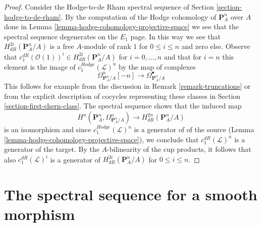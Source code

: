 \begin{proof}
Consider the Hodge-to-de Rham spectral sequence of
Section \ref{section-hodge-to-de-rham}.
By the computation of the Hodge cohomology of $\mathbf{P}^n_A$ over $A$
done in Lemma \ref{lemma-hodge-cohomology-projective-space}
we see that the spectral sequence degenerates on the $E_1$ page.
In this way we see that $H^{2i}_{dR}(\mathbf{P}^n_A/A)$ is a free
$A$-module of rank $1$ for $0 \leq i \leq n$ and zero else.
Observe that $c_1^{dR}(\mathcal{O}(1))^i \in H^{2i}_{dR}(\mathbf{P}^n_A/A)$
for $i = 0, \ldots, n$ and that for $i = n$ this element is the
image of $c_1^{Hodge}(\mathcal{L})^n$ by the map of complexes
$$
\Omega^n_{\mathbf{P}^n_A/A}[-n]
\longrightarrow
\Omega^\bullet_{\mathbf{P}^n_A/A}
$$
This follows for example from the discussion in Remark \ref{remark-truncations}
or from the explicit description of cocycles representing these classes in
Section \ref{section-first-chern-class}.
The spectral sequence shows that the induced map
$$
H^n(\mathbf{P}^n_A, \Omega^n_{\mathbf{P}^n_A/A}) \longrightarrow
H^{2n}_{dR}(\mathbf{P}^n_A/A)
$$
is an isomorphism and since $c_1^{Hodge}(\mathcal{L})^n$ is a generator of
of the source (Lemma \ref{lemma-hodge-cohomology-projective-space}),
we conclude that $c_1^{dR}(\mathcal{L})^n$ is a generator
of the target. By the $A$-bilinearity of the cup products,
it follows that also $c_1^{dR}(\mathcal{L})^i$
is a generator of $H^{2i}_{dR}(\mathbf{P}^n_A/A)$ for
$0 \leq i \leq n$.
\end{proof}









\section{The spectral sequence for a smooth morphism}
\label{section-relative-spectral-sequence}

